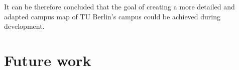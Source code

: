 It can be therefore concluded that the goal of creating a more detailed and adapted campus map of TU Berlin's campus could be achieved during development.

\section{Future work} \label{sec:future_work}

